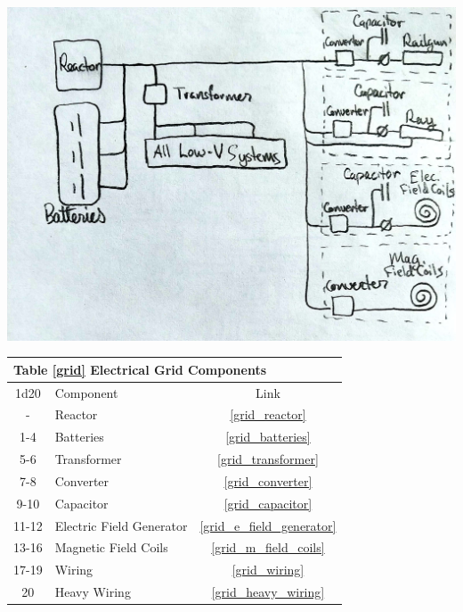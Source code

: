 \documentclass[a4paper]{article}
\begin{document}
\vspace{0.2cm}
\includegraphics[scale=0.3]{Electrical_Grid}

\vspace{0.5cm} \hspace{0.25\linewidth}
\def\grid_components{
\begin{tabular}[t]{@{} | c | l | c | @{}}
\toprule
\multicolumn{3}{|l|}{Table \ref{grid} Electrical Grid Components} \\
\toprule
1d20 & Component & Link \\
\midrule
- & Reactor & \ref{grid_reactor} \\
1-4 & Batteries & \ref{grid_batteries} \\
5-6 & Transformer & \ref{grid_transformer} \\
7-8 & Converter & \ref{grid_converter} \\
9-10 & Capacitor & \ref{grid_capacitor} \\
11-12 & Electric Field Generator & \ref{grid_e_field_generator} \\
13-16 & Magnetic Field Coils & \ref{grid_m_field_coils} \\
17-19 & Wiring & \ref{grid_wiring} \\
20 & Heavy Wiring & \ref{grid_heavy_wiring} \\
\bottomrule
\end{tabular}
}
\grid_components
\end{document}
